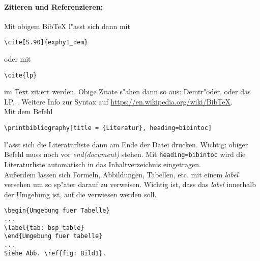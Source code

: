 \documentclass[11pt, a4paper]{article}
\begin{document}
	\paragraph{Zitieren und Referenzieren:}
	Mit obigem Bib\TeX{} l"asst sich dann mit
	\begin{verbatim}
\cite[S.90]{exphy1_dem}
	\end{verbatim}
	oder mit
	\begin{verbatim}
\cite{lp}
	\end{verbatim}
	im Text zitiert werden. Obige Zitate s"ahen dann so aus: Demtr"oder, \cite[S. 90]{exphy1_dem} oder das LP, \cite{lp}. Weitere Info zur Syntax auf \url{https://en.wikipedia.org/wiki/BibTeX}.\\
	Mit dem Befehl
	\begin{verbatim}
\printbibliography[title = {Literatur}, heading=bibintoc]
	\end{verbatim}
    l"asst sich die Literaturliste dann am Ende der Datei drucken. Wichtig: obiger Befehl muss noch vor \emph{end(document)} stehen. Mit \texttt{heading=bibintoc} wird die Literaturliste automatisch in das Inhaltverzeichnis eingetragen.\\

	Au\ss erdem lassen sich Formeln, Abbildungen, Tabellen, etc. mit einem \emph{label} versehen um so sp"ater darauf zu verweisen. Wichtig ist, dass das \emph{label} innerhalb der Umgebung ist, auf die verwiesen werden soll.

	\begin{verbatim}
\begin{Umgebung fuer Tabelle}
...
\label{tab: bsp_table}
\end{Umgebung fuer tabelle}
...
Siehe Abb. \ref{fig: Bild1}.
	\end{verbatim}
\end{document}
